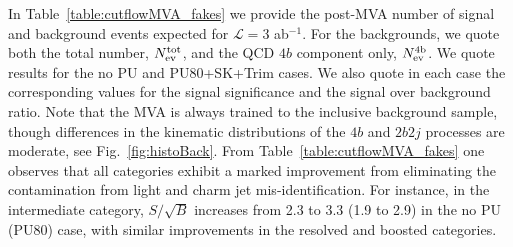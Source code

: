 In Table~\ref{table:cutflowMVA_fakes} we provide
the post-MVA number of signal and background events  expected for
$\mathcal{L}=3$ ab$^{-1}$.
%
For the backgrounds, we quote
both
the total number, $N_{\rm ev}^{\rm tot}$,
and the  QCD $4b$ component only,
$N_{\rm ev}^{\rm 4b}$.
%
We quote results for the no PU and PU80+SK+Trim cases.
%
 We also quote in each case the corresponding values for the signal 
    significance and the signal over background ratio.
    Note that the MVA is always trained to the inclusive background sample,
    though differences
    in the kinematic distributions of the $4b$ and $2b2j$ processes are
    moderate,
    see Fig.~\ref{fig:histoBack}.
    From Table~\ref{table:cutflowMVA_fakes} one observes that
    all categories exhibit
    a marked improvement from eliminating the contamination
    from light and charm jet mis-identification.
    For instance, in the intermediate category,
    $S/\sqrt{B}$ increases from 2.3 to 3.3 (1.9 to 2.9)
    in the no PU (PU80) case, with similar improvements in the
    resolved and boosted categories.

